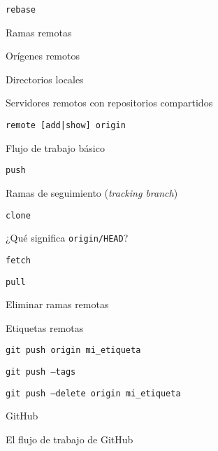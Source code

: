 \begin{longenum}
\begin{longenum}
\begin{longenum}
            \item \texttt{rebase}
        \end{longenum}
        \item Ramas remotas
        \begin{longenum}
            \item Orígenes remotos
            \begin{longenum}
                \item Directorios locales 
                \item Servidores remotos con repositorios compartidos
                \item \texttt{remote [add|show] origin}
            \end{longenum}
            \item Flujo de trabajo básico
            \begin{longenum}
                \item \texttt{push}
                \begin{longenum}
                    \item Ramas de seguimiento (\textit{tracking branch})
                \end{longenum}
                \item \texttt{clone}
                \begin{longenum}
                    \item ¿Qué significa \texttt{origin/HEAD}?
                \end{longenum}
                \item \texttt{fetch}
                \item \texttt{pull}
            \end{longenum}
            \item Eliminar ramas remotas
            \item Etiquetas remotas
            \begin{longenum}
                \item \texttt{git push origin mi\_etiqueta}
                \item \texttt{git push --tags}
                \item \texttt{git push --delete origin mi\_etiqueta}
            \end{longenum}
        \end{longenum}
        \item GitHub
        \begin{longenum}
            \item El flujo de trabajo de GitHub

\end{longenum}
\end{longenum}
\end{longenum}
